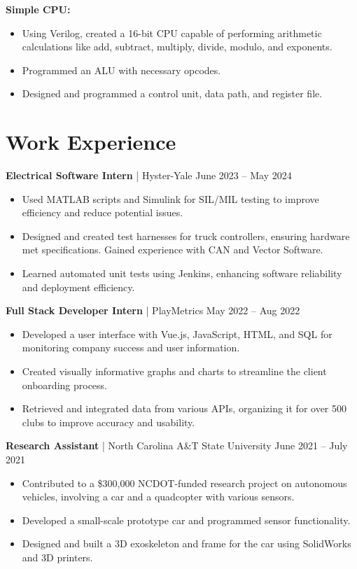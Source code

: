 \documentclass[letterpaper,9pt]{article}
\begin{document}
\noindent \textbf{Simple CPU:}
\begin{itemize}[leftmargin=*,itemsep=0pt,topsep=0pt]
    \item Using Verilog, created a 16-bit CPU capable of performing arithmetic calculations like add, subtract, multiply, divide, modulo, and exponents.
    \item Programmed an ALU with necessary opcodes.
    \item Designed and programmed a control unit, data path, and register file.
\end{itemize}

\section*{Work Experience}
\noindent \textbf{Electrical Software Intern} | Hyster-Yale \hfill June 2023 – May 2024
\begin{itemize}[leftmargin=*,itemsep=0pt,topsep=0pt]
    \item Used MATLAB scripts and Simulink for SIL/MIL testing to improve efficiency and reduce potential issues.
    \item Designed and created test harnesses for truck controllers, ensuring hardware met specifications. Gained experience with CAN and Vector Software.
    \item Learned automated unit tests using Jenkins, enhancing software reliability and deployment efficiency.
\end{itemize}
\noindent \textbf{Full Stack Developer Intern} | PlayMetrics \hfill May 2022 – Aug 2022
\begin{itemize}[leftmargin=*,itemsep=0pt,topsep=0pt]
    \item Developed a user interface with Vue.js, JavaScript, HTML, and SQL for monitoring company success and user information.
    \item Created visually informative graphs and charts to streamline the client onboarding process.
    \item Retrieved and integrated data from various APIs, organizing it for over 500 clubs to improve accuracy and usability.
\end{itemize}
\noindent \textbf{Research Assistant} | North Carolina A\&T State University \hfill June 2021 – July 2021
\begin{itemize}[leftmargin=*,itemsep=0pt,topsep=0pt]
    \item Contributed to a \$300,000 NCDOT-funded research project on autonomous vehicles, involving a car and a quadcopter with various sensors.
    \item Developed a small-scale prototype car and programmed sensor functionality.
    \item Designed and built a 3D exoskeleton and frame for the car using SolidWorks and 3D printers.
\end{itemize}
\end{document}
